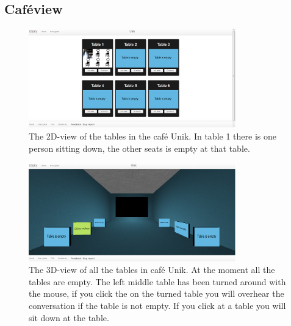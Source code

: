 \documentclass[12pt, titlepage]{article}
\begin{document}
\subsection{Caféview}
\begin{figure}[H]
  \centering
	\includegraphics[width=0.8\textwidth,keepaspectratio]{thetables.png}
  \caption{The 2D-view of the tables in the café Unik. In table 1 there is one person sitting down, the other seats is empty at that table.}
\end{figure}
\begin{figure}[H]
  \centering
	\includegraphics[width=0.8\textwidth,keepaspectratio]{thetables3D.png}
  \caption{The 3D-view of all the tables in café Unik. At the moment all the tables are empty. The left middle table has been turned around with the mouse, if you click the on the turned table you will overhear the conversation if the table is not empty. If you click at a table you will sit down at the table.}
\end{figure}
\end{document}
